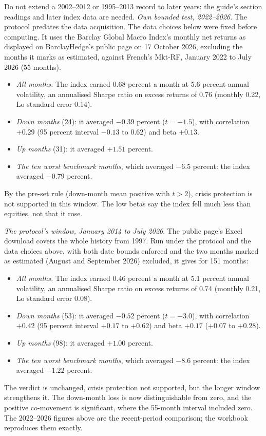 \begin{qfevidence}
 Do not extend a 2002--2012 or 1995--2013 record to later years: the guide's section readings and later index data are needed. \emph{Own bounded test, 2022--2026}. The protocol predates the data acquisition. The data choices below were fixed before computing. It uses the Barclay Global Macro Index's monthly net returns as displayed on BarclayHedge's public page on 17 October 2026, excluding the months it marks as estimated, against French's Mkt-RF, January 2022 to July 2026 (55 months).
\begin{itemize}
\item \emph{All months.} The index earned 0.68 percent a month at 5.6 percent annual volatility, an annualised Sharpe ratio on excess returns of 0.76 (monthly 0.22, Lo standard error 0.14).
\item \emph{Down months} (24): it averaged $-0.39$ percent ($t=-1.5$), with correlation $+0.29$ (95 percent interval $-0.13$ to $0.62$) and beta $+0.13$.
\item \emph{Up months} (31): it averaged $+1.51$ percent.
\item \emph{The ten worst benchmark months}, which averaged $-6.5$ percent: the index averaged $-0.79$ percent.
\end{itemize}
By the pre-set rule (down-month mean positive with $t>2$), crisis protection is not supported in this window. The low betas say the index fell much less than equities, not that it rose.

\emph{The protocol's window, January 2014 to July 2026}. The public page's Excel download covers the whole history from 1997. Run under the protocol and the data choices above, with both date bounds enforced and the two months marked as estimated (August and September 2026) excluded, it gives for 151 months:
\begin{itemize}
\item \emph{All months.} The index earned 0.46 percent a month at 5.1 percent annual volatility, an annualised Sharpe ratio on excess returns of 0.74 (monthly 0.21, Lo standard error 0.08).
\item \emph{Down months} (53): it averaged $-0.52$ percent ($t=-3.0$), with correlation $+0.42$ (95 percent interval $+0.17$ to $+0.62$) and beta $+0.17$ ($+0.07$ to $+0.28$).
\item \emph{Up months} (98): it averaged $+1.00$ percent.
\item \emph{The ten worst benchmark months}, which averaged $-8.6$ percent: the index averaged $-1.22$ percent.
\end{itemize}
The verdict is unchanged, crisis protection not supported, but the longer window strengthens it. The down-month loss is now distinguishable from zero, and the positive co-movement is significant, where the 55-month interval included zero. The 2022--2026 figures above are the recent-period comparison; the workbook reproduces them exactly.


\end{qfevidence}
